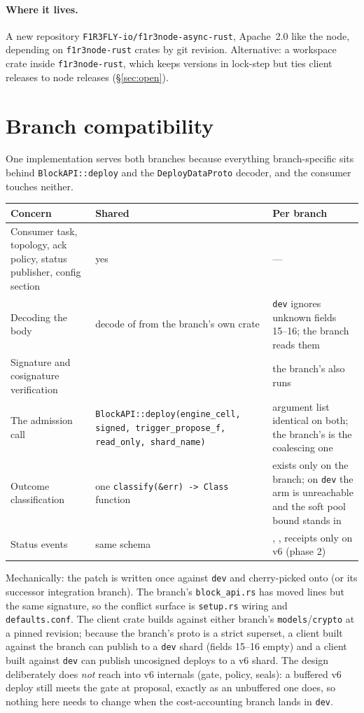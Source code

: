 \documentclass[11pt]{article}
\newcommand{\code}[1]{\texttt{#1}}
\newcommand{\dev}{\code{dev}}
\newcommand{\ote}{\path{feature/rev-stacks-ote}}
\begin{document}
\paragraph{Where it lives.} A new repository \code{F1R3FLY-io/f1r3node-async-rust},
Apache~2.0 like the node, depending on \code{f1r3node-rust} crates by git revision.
Alternative: a  workspace crate inside \code{f1r3node-rust}, which
keeps versions in lock-step but ties client releases to node releases
(\S\ref{sec:open}).

\section{Branch compatibility}

One implementation serves both branches because everything branch-specific sits
behind \code{BlockAPI::deploy} and the \code{DeployDataProto} decoder, and the
consumer touches neither.
\begin{center}\small
\begin{tabularx}{\textwidth}{L{3.4cm} X X}
\toprule
Concern & Shared & Per branch \\
\midrule
Consumer task, topology, ack policy, status publisher, config section & yes & --- \\
Decoding the body &  decode of  from the branch's own  crate & \dev{} ignores unknown fields 15--16; the branch reads them \\
Signature and cosignature verification &  & the branch's  also runs  \\
The admission call & \code{BlockAPI::deploy(engine\_cell, signed, trigger\_propose\_f, read\_only, shard\_name)} & argument list identical on both; the branch's  is the coalescing one \\
Outcome classification & one \code{classify(\&err) -> Class} function &  exists only on the branch; on \dev{} the arm is unreachable and the soft pool bound stands in \\
Status events & same schema & , , receipts only on v6 (phase 2) \\
\bottomrule
\end{tabularx}
\end{center}
Mechanically: the patch is written once against \dev{} and cherry-picked onto \ote{}
(or its successor integration branch). The branch's \code{block\_api.rs} has moved
lines but the same signature, so the conflict surface is \code{setup.rs} wiring and
\code{defaults.conf}. The client crate builds against either branch's
\code{models}/\code{crypto} at a pinned revision; because the branch's proto is a
strict superset, a client built against the branch can publish to a \dev{} shard
(fields 15--16 empty) and a client built against \dev{} can publish uncosigned deploys
to a v6 shard. The design deliberately does \emph{not} reach into v6 internals (gate,
policy, seals): a buffered v6 deploy still meets the gate at proposal, exactly as an
unbuffered one does, so nothing here needs to change when the cost-accounting branch
lands in \dev.
\end{document}

